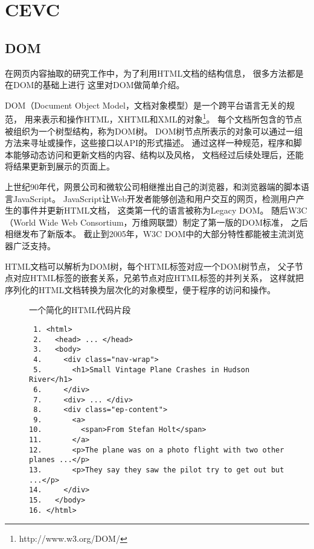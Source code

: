 \section{CEVC}
\label{sec:cevc-method}

\subsection{DOM}
\label{subsec:dom}
在网页内容抽取的研究工作中，为了利用HTML文档的结构信息，
很多方法都是在DOM的基础上进行
这里对DOM做简单介绍。

DOM（Document Object Model，文档对象模型）是一个跨平台语言无关的规范，
用来表示和操作HTML，XHTML和XML的对象\footnote{http://www.w3.org/DOM/}。
每个文档所包含的节点被组织为一个树型结构，称为DOM树。
DOM树节点所表示的对象可以通过一组方法来寻址或操作，这些接口以API的形式描述。
通过这样一种规范，程序和脚本能够动态访问和更新文档的内容、结构以及风格，
文档经过后续处理后，还能将结果更新到展示的页面上。

上世纪90年代，网景公司和微软公司相继推出自己的浏览器，和浏览器端的脚本语言JavaScript。
JavaScript让Web开发者能够创造和用户交互的网页，检测用户产生的事件并更新HTML文档，
这类第一代的语言被称为Legacy DOM。
随后W3C（World Wide Web Consortium，万维网联盟）制定了第一版的DOM标准，
之后相继发布了新版本。
截止到2005年，W3C DOM中的大部分特性都能被主流浏览器广泛支持。

HTML文档可以解析为DOM树，每个HTML标签对应一个DOM树节点，
父子节点对应HTML标签的嵌套关系，兄弟节点对应HTML标签的并列关系，
这样就把序列化的HTML文档转换为层次化的对象模型，便于程序的访问和操作。

\begin{figure}[htbp]
\begin{example}
\label{ex:html}
一个简化的HTML代码片段
\end{example}
\begin{verbatim}
 1. <html>
 2.   <head> ... </head>
 3.   <body>
 4.     <div class="nav-wrap">
 5.       <h1>Small Vintage Plane Crashes in Hudson River</h1>
 6.     </div>
 7.     <div> ... </div>
 8.     <div class="ep-content">
 9.       <a>
10.         <span>From Stefan Holt</span>
11.       </a>
12.       <p>The plane was on a photo flight with two other planes ...</p>
13.       <p>They say they saw the pilot try to get out but ...</p>
14.     </div>
15.   </body>
16. </html>
\end{verbatim}
\end{figure}

